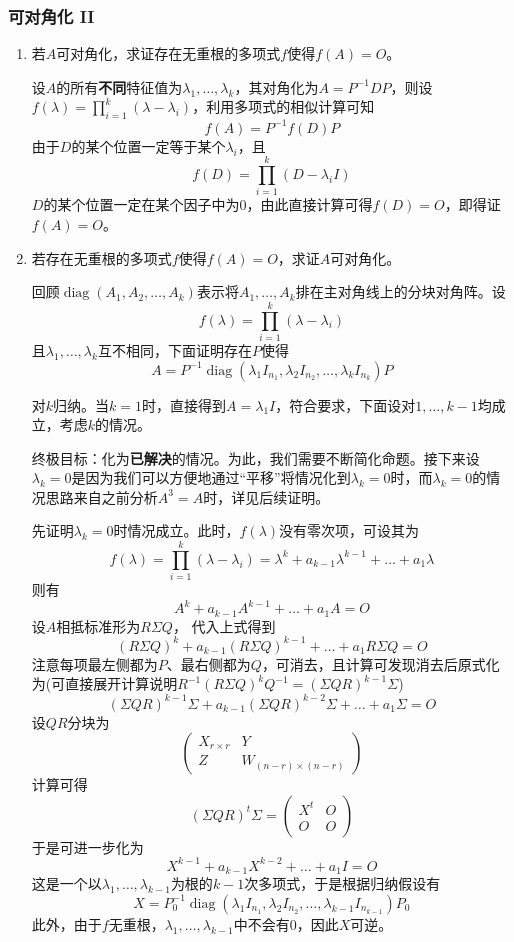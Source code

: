 \documentclass[a4paper,UTF8,fontset=windows]{ctexart}
\DeclareMathOperator{\diag}{diag}
\newcommand*{\note}{\noindent *}
\begin{document}
\subsubsection{可对角化 II}
\begin{enumerate}
    \item 若$A$可对角化，求证存在无重根的多项式$f$使得$f(A)=O$。
    
    设$A$的所有\textbf{不同}特征值为$\lambda_1,\dots,\lambda_k$，其对角化为$A=P^{-1}DP$，则设$f(\lambda)=\prod_{i=1}^k(\lambda-\lambda_i)$，利用多项式的相似计算可知
    $$f(A)=P^{-1}f(D)P$$
    由于$D$的某个位置一定等于某个$\lambda_i$，且
    $$f(D)=\prod_{i=1}^k(D-\lambda_iI)$$
    $D$的某个位置一定在某个因子中为0，由此直接计算可得$f(D)=O$，即得证$f(A)=O$。

    \item 若存在无重根的多项式$f$使得$f(A)=O$，求证$A$可对角化。
    
    回顾$\diag(A_1,A_2,\dots,A_k)$表示将$A_1,\dots,A_k$排在主对角线上的分块对角阵。设
    $$f(\lambda)=\prod_{i=1}^k(\lambda-\lambda_i)$$
    且$\lambda_1,\dots,\lambda_k$互不相同，下面证明存在$P$使得
    $$A=P^{-1}\diag(\lambda_1I_{n_1},\lambda_2I_{n_2},\dots,\lambda_kI_{n_k})P$$

    对$k$归纳。当$k=1$时，直接得到$A=\lambda_1I$，符合要求，下面设对$1,\dots,k-1$均成立，考虑$k$的情况。

    \note 终极目标：化为\textbf{已解决}的情况。为此，我们需要不断简化命题。接下来设$\lambda_k=0$是因为我们可以方便地通过``平移''将情况化到$\lambda_k=0$时，而$\lambda_k=0$的情况思路来自之前分析$A^3=A$时，详见后续证明。

    先证明$\lambda_k=0$时情况成立。此时，$f(\lambda)$没有零次项，可设其为
    $$f(\lambda)=\prod_{i=1}^k(\lambda-\lambda_i)=\lambda^k+a_{k-1}\lambda^{k-1}+\dots+a_1\lambda$$
    则有
    $$A^k+a_{k-1}A^{k-1}+\dots+a_1A=O$$
    设$A$相抵标准形为$R\Sigma Q$， 代入上式得到
    $$(R\Sigma Q)^k+a_{k-1}(R\Sigma Q)^{k-1}+\dots+a_1R\Sigma Q=O$$
    注意每项最左侧都为$P$、最右侧都为$Q$，可消去，且计算可发现消去后原式化为(可直接展开计算说明$R^{-1}(R\Sigma Q)^kQ^{-1}=(\Sigma QR)^{k-1}\Sigma$)
    $$(\Sigma QR)^{k-1}\Sigma+a_{k-1}(\Sigma QR)^{k-2}\Sigma+\dots+a_1\Sigma=O$$
    设$QR$分块为
    $$\begin{pmatrix}X_{r\times r}&Y\\Z&W_{(n-r)\times(n-r)}\end{pmatrix}$$
    计算可得
    $$(\Sigma QR)^t\Sigma=\begin{pmatrix}X^t&O\\O&O\end{pmatrix}$$
    于是可进一步化为
    $$X^{k-1}+a_{k-1}X^{k-2}+\dots+a_1I=O$$
    这是一个以$\lambda_1,\dots,\lambda_{k-1}$为根的$k-1$次多项式，于是根据归纳假设有
    $$X=P_0^{-1}\diag(\lambda_1I_{n_1},\lambda_2I_{n_2},\dots,\lambda_{k-1}I_{n_{k-1}})P_0$$
    此外，由于$f$无重根，$\lambda_1,\dots,\lambda_{k-1}$中不会有0，因此$X$可逆。


\end{enumerate}
\end{document}
